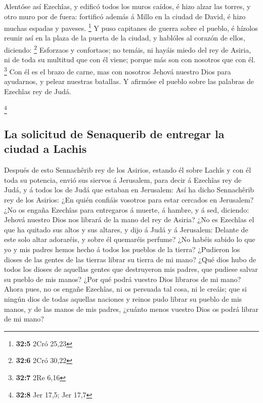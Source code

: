  Alentóse así Ezechîas, y edificó todos los muros caídos, é
hizo alzar las torres, y otro muro por de fuera: fortificó además á
Millo en la ciudad de David, é hizo muchas espadas y paveses.
\footnote{\textbf{32:5} 2Cró 25,23}  Y puso capitanes de
guerra sobre el pueblo, é hízolos reunir así en la plaza de la puerta de
la ciudad, y hablóles al corazón de ellos, diciendo: \footnote{\textbf{32:6}
  2Cró 30,22}  Esforzaos y confortaos; no temáis, ni hayáis
miedo del rey de Asiria, ni de toda su multitud que con él viene; porque
más son con nosotros que con él. \footnote{\textbf{32:7} 2Re 6,16}
 Con él es el brazo de carne, mas con nosotros Jehová
nuestro Dios para ayudarnos, y pelear nuestras batallas. Y afirmóse el
pueblo sobre las palabras de Ezechîas rey de Judá.

\footnote{\textbf{32:8} Jer 17,5; Jer 17,7}

\hypertarget{la-solicitud-de-senaquerib-de-entregar-la-ciudad-a-lachis}{%
\subsection{La solicitud de Senaquerib de entregar la ciudad a
Lachis}\label{la-solicitud-de-senaquerib-de-entregar-la-ciudad-a-lachis}}

 Después de esto Sennachêrib rey de los Asirios, estando él
sobre Lachîs y con él toda su potencia, envió sus siervos á Jerusalem,
para decir á Ezechîas rey de Judá, y á todos los de Judá que estaban en
Jerusalem:  Así ha dicho Sennachêrib rey de los Asirios:
¿En quién confiáis vosotros para estar cercados en Jerusalem?
 ¿No os engaña Ezechîas para entregaros á muerte, á hambre,
y á sed, diciendo: Jehová nuestro Dios nos librará de la mano del rey de
Asiria?  ¿No es Ezechîas el que ha quitado sus altos y sus
altares, y dijo á Judá y á Jerusalem: Delante de este solo altar
adoraréis, y sobre él quemaréis perfume?  ¿No habéis sabido
lo que yo y mis padres hemos hecho á todos los pueblos de la tierra?
¿Pudieron los dioses de las gentes de las tierras librar su tierra de mi
mano?  ¿Qué dios hubo de todos los dioses de aquellas
gentes que destruyeron mis padres, que pudiese salvar su pueblo de mis
manos? ¿Por qué podrá vuestro Dios libraros de mi mano? 
Ahora pues, no os engañe Ezechîas, ni os persuada tal cosa, ni le
creáis; que si ningún dios de todas aquellas naciones y reinos pudo
librar su pueblo de mis manos, y de las manos de mis padres, ¿cuánto
menos vuestro Dios os podrá librar de mi mano?

